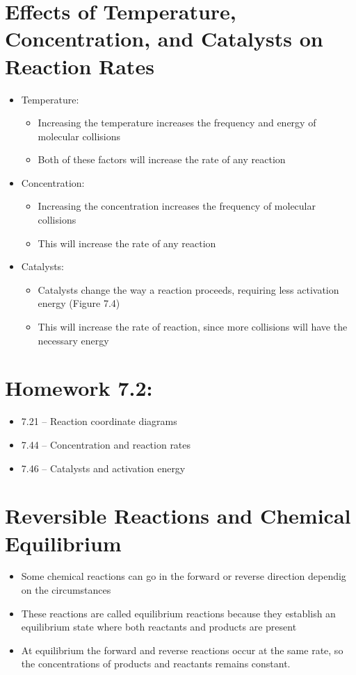 \documentclass[12pt, openany, letterpaper]{memoir}
\begin{document}
\section{Effects of Temperature, Concentration, and Catalysts on Reaction Rates}
\begin{itemize}
	\item Temperature:
	      \begin{itemize}
		      \item Increasing the temperature increases the frequency and energy of molecular collisions
		      \item Both of these factors will increase the rate of any reaction
	      \end{itemize}
	\item Concentration:
	      \begin{itemize}
		      \item Increasing the concentration increases the frequency of molecular collisions
		      \item This will increase the rate of any reaction
	      \end{itemize}
	\item Catalysts:
	      \begin{itemize}
		      \item Catalysts change the way a reaction proceeds, requiring less activation energy (Figure 7.4)
		      \item This will increase the rate of reaction, since more collisions will have the necessary energy
	      \end{itemize}
\end{itemize}

\section*{Homework 7.2:}
\begin{itemize}
	\item 7.21 -- Reaction coordinate diagrams
	\item 7.44 -- Concentration and reaction rates
	\item 7.46 -- Catalysts and activation energy
\end{itemize}

\section{Reversible Reactions and Chemical Equilibrium}
\begin{itemize}
	\item Some chemical reactions can go in the forward or reverse direction dependig on the circumstances
	\item These reactions are called equilibrium reactions because they establish an equilibrium state where both reactants and products are present
	\item At equilibrium the forward and reverse reactions occur at the same rate, so the concentrations of products and reactants remains constant.
\end{itemize}
\end{document}
